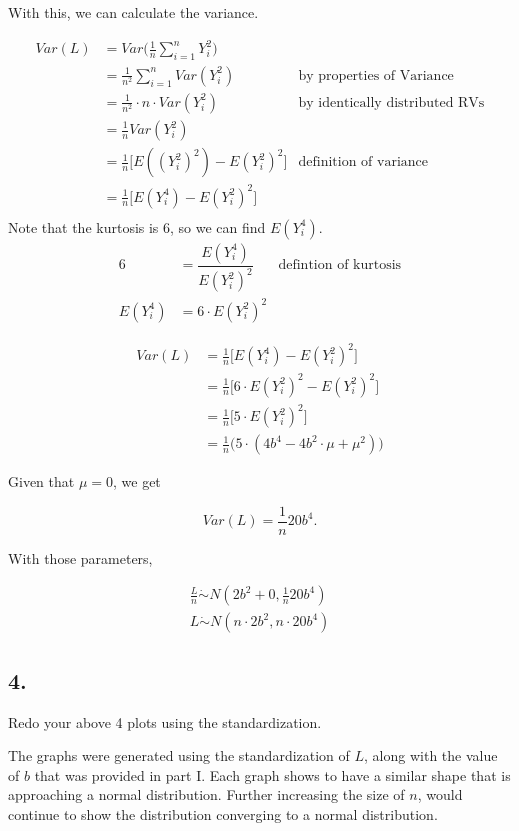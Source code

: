 \documentclass[12pt]{article}
\begin{document}
With this, we can calculate the variance.

\begin{align*}
	Var(L)  & = Var \Big( \frac{ 1 }{ n } \sum_{i = 1}^{n} Y_i^2 \Big) \\
		& = \frac{ 1 }{ n^2 } \sum_{i = 1}^{n} Var(  Y_i^2)  & \text{by properties of Variance}\\
		& =  \frac{ 1 }{ n^2 }\cdot  n \cdot Var(  Y_i^2) & \text{by identically distributed RVs}\\
		& = \frac{ 1 }{ n }Var(Y_i^2) \\
		& = \frac{ 1 }{ n } \Big[ E( (Y_i^2)^2) - E(Y_i^2)^2  \Big] & \text{definition of variance} \\
		& = \frac{ 1 }{ n } \Big[ E( Y_i^4) - E(Y_i^2)^2  \Big] \\
\end{align*}
Note that the kurtosis is 6, so we can find  $E(Y_i^4)$.
\begin{align*}
	6 & = \dfrac{E(Y_i^4)}{E(Y_i^2)^2} & \text{defintion of kurtosis} \\
	E(Y_i^4) & = 6 \cdot E(Y_i^2)^2
\end{align*}

\begin{align*}
Var(L) & =  \frac{ 1 }{ n } \Big[ E( Y_i^4) - E(Y_i^2)^2  \Big] \\
	& =  \frac{ 1 }{ n } \Big[ 6 \cdot E(Y_i^2)^2 - E(Y_i^2)^2  \Big] \\
	& =  \frac{ 1 }{ n } \Big[ 5 \cdot E(Y_i^2)^2  \Big] \\
	& = \frac{ 1 }{ n } \Big( 5\cdot (4b^4 - 4b^2\cdot \mu + \mu^2 ) \Big)
\end{align*}

Given that $\mu = 0$, we get

$$Var(L)  = \frac{ 1 }{ n } 20b^4.$$

With those parameters, 

\begin{align*}
	\frac{ L }{ n } \dot{\sim} N(2b^2+0, \frac{ 1 }{ n } 20b^4)\\
	L \dot{\sim} N ( n\cdot 2b^2, n\cdot 20b^4)
\end{align*}

\subsection{4.}
Redo your above 4 plots using the standardization.

\bigskip
\noindent
The graphs were generated using the standardization of $L$, along with the value of $b$ that was provided in part I. Each graph shows to have a similar shape that is approaching a normal distribution. Further increasing the size of $n$, would continue to show the distribution converging to a normal distribution. 
\end{document}
